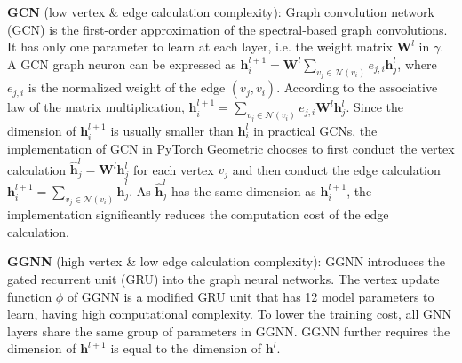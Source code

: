 \textbf{GCN} \cite{kipf2017_gcn} (low vertex \& edge calculation complexity): Graph convolution network (GCN) is the first-order approximation of the spectral-based graph convolutions.
It has only one parameter to learn at each layer, i.e. the weight matrix $\boldsymbol{W}^l$ in $\gamma$.
A GCN graph neuron can be expressed as $\boldsymbol{h}^{l+1}_i = \boldsymbol{W}^l\sum_{v_j \in \mathcal{N}(v_i)}{e_{j,i}\boldsymbol{h}^l_j}$, where $e_{j,i}$ is the normalized weight of the edge $(v_j, v_i)$.
According to the associative law of the matrix multiplication, $\boldsymbol{h}^{l+1}_i = \sum_{v_j \in \mathcal{N}(v_i)}{e_{j,i}\boldsymbol{W}^l\boldsymbol{h}^l_j}$.
Since the dimension of $\boldsymbol{h}^{l+1}_i$ is usually smaller than $\boldsymbol{h}^l_i$ in practical GCNs, the implementation of GCN in PyTorch Geometric chooses to first conduct the vertex calculation $\hat{\boldsymbol{h}}^l_j = \boldsymbol{W}^l\boldsymbol{h}^l_j$ for each vertex $v_j$ and then conduct the edge calculation $\boldsymbol{h}^{l+1}_i=\sum_{v_j\in\mathcal{N}(v_i)}{\hat{\boldsymbol{h}}^l_j}$.
As $\hat{\boldsymbol{h}}^l_j$ has the same dimension as $\boldsymbol{h}^{l+1}_i$, the implementation significantly reduces the  computation cost of the edge calculation.

\textbf{GGNN} (high vertex \& low edge calculation complexity):
GGNN introduces the gated recurrent unit (GRU) into the graph neural networks.
The vertex update function $\phi$ of GGNN is a modified GRU unit that has 12 model parameters to learn, having high computational complexity.
To lower the training cost, all GNN layers share the same group of parameters in GGNN.
GGNN further requires the dimension of $\boldsymbol{h}^{l+1}$ is equal to the dimension of $\boldsymbol{h}^l$.

